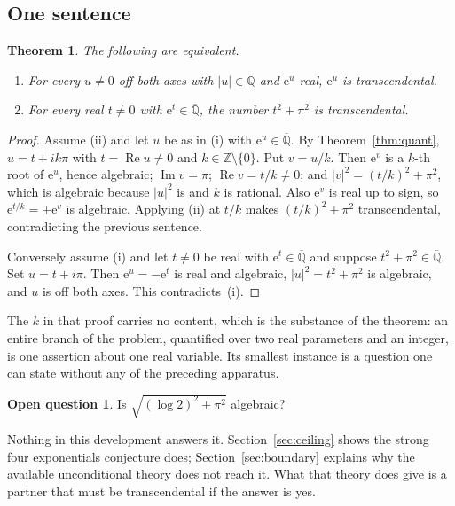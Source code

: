 \documentclass[11pt,a4paper]{article}
\theoremstyle{plain}
\newtheorem{theorem}{Theorem}[section]
\theoremstyle{definition}
\newtheorem*{problem*}{Open question}
\newcommand{\e}{\mathrm{e}}
\newcommand{\Z}{\mathbb{Z}}
\newcommand{\Alg}{\overline{\mathbb{Q}}}
\begin{document}
\subsection*{One sentence}

\begin{theorem}\label{thm:one-relation}
The following are equivalent.
\begin{enumerate}[label=\textup{(\roman*)}]
  \item For every $u\neq0$ off both axes with $\lvert u\rvert\in\Alg$ and $\e^{u}$ real,
        $\e^{u}$ is transcendental.
  \item For every real $t\neq0$ with $\e^{t}\in\Alg$, the number $t^{2}+\pi^{2}$ is
        transcendental.
\end{enumerate}
\end{theorem}

\begin{proof}
Assume (ii) and let $u$ be as in (i) with $\e^{u}\in\Alg$. By Theorem~\ref{thm:quant},
$u=t+ik\pi$ with $t=\operatorname{Re}u\neq0$ and $k\in\Z\setminus\{0\}$. Put $v=u/k$. Then
$\e^{v}$ is a $k$-th root of $\e^{u}$, hence algebraic; $\operatorname{Im}v=\pi$;
$\operatorname{Re}v=t/k\neq0$; and
$\lvert v\rvert^{2}=(t/k)^{2}+\pi^{2}$, which is algebraic because $\lvert u\rvert^{2}$ is and
$k$ is rational. Also $\e^{v}$ is real up to sign, so $\e^{t/k}=\pm\e^{v}$ is algebraic.
Applying (ii) at $t/k$ makes $(t/k)^{2}+\pi^{2}$ transcendental, contradicting the previous
sentence.

Conversely assume (i) and let $t\neq0$ be real with $\e^{t}\in\Alg$ and suppose
$t^{2}+\pi^{2}\in\Alg$. Set $u=t+i\pi$. Then $\e^{u}=-\e^{t}$ is real and algebraic,
$\lvert u\rvert^{2}=t^{2}+\pi^{2}$ is algebraic, and $u$ is off both axes. This contradicts~(i).
\end{proof}

The $k$ in that proof carries no content, which is the substance of the theorem: an entire branch
of the problem, quantified over two real parameters and an integer, is one assertion about one
real variable. Its smallest instance is a question one can state without any of the preceding
apparatus.

\begin{problem*}
Is $\sqrt{(\log 2)^{2}+\pi^{2}}$ algebraic?
\end{problem*}

Nothing in this development answers it. Section~\ref{sec:ceiling} shows the strong four
exponentials conjecture does; Section~\ref{sec:boundary} explains why the available
unconditional theory does not reach it. What that theory does give is a partner that must be
transcendental if the answer is yes.
\end{document}
